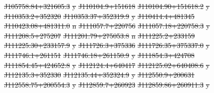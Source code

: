 \documentclass[11pt, a4paper]{book}
\providecommand{\DIFdeltex}[1]{{\protect\color{red}\sout{#1}}}                      %
\providecommand{\DIFdelFL}[1]{\DIFdel{#1}} %
\providecommand{\DIFdel}[1]{\texorpdfstring{\DIFdeltex{#1}}{}} %
\begin{document}
\DIFdelFL{J105758.84+321605.3 }%
\DIFdelFL{y}%
\DIFdelFL{J110104.9+151618 }%
\DIFdelFL{J110104.90+151618.2 }%
\DIFdelFL{y}%
\DIFdelFL{J110353.2+352320 }%
\DIFdelFL{J110353.37+352319.9 }%
\DIFdelFL{y}%
\DIFdelFL{J110414.4+481345 }%
\DIFdelFL{J110423.08+481311.0 }%
\DIFdelFL{n}%
\DIFdelFL{J111057.7+220756 }%
\DIFdelFL{J111057.18+220758.3 }%
\DIFdelFL{y}%
\DIFdelFL{J111208.5+275207 }%
\DIFdelFL{J111201.79+275053.8 }%
\DIFdelFL{n}%
\DIFdelFL{J111225.2+233159 }%
\DIFdelFL{J111225.30+233157.9 }%
\DIFdelFL{y}%
\DIFdelFL{J111726.3+375336 }%
\DIFdelFL{J111726.35+375337.0 }%
\DIFdelFL{y}%
\DIFdelFL{J111746.1+261151 }%
\DIFdelFL{J111746.18+261150.9 }%
\DIFdelFL{y}%
\DIFdelFL{J111854.3+424708 }%
\DIFdelFL{J111854.45+424652.8 }%
\DIFdelFL{y}%
\DIFdelFL{J112124.4+640417 }%
\DIFdelFL{J112125.02+640408.6 }%
\DIFdelFL{y}%
\DIFdelFL{J112135.3+352330 }%
\DIFdelFL{J112135.44+352324.9 }%
\DIFdelFL{y}%
\DIFdelFL{J112550.9+200631 }%
\DIFdelFL{J112558.75+200554.3 }%
\DIFdelFL{y}%
\DIFdelFL{J112859.7+260923 }%
\DIFdelFL{J112859.86+260911.3 }%
\DIFdelFL{y}%
\end{document}
